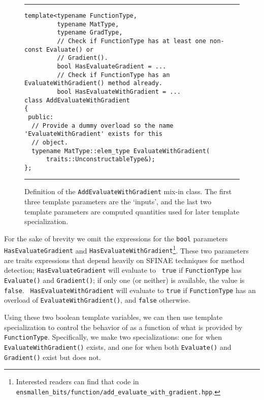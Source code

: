 \begin{figure}[b!]
\hrule
\vspace{1ex}
\begin{verbatim}
template<typename FunctionType,
         typename MatType,
         typename GradType,
         // Check if FunctionType has at least one non-const Evaluate() or
         // Gradient().
         bool HasEvaluateGradient = ...
         // Check if FunctionType has an EvaluateWithGradient() method already.
         bool HasEvaluateWithGradient = ...
class AddEvaluateWithGradient
{
 public:
  // Provide a dummy overload so the name 'EvaluateWithGradient' exists for this
  // object.
  typename MatType::elem_type EvaluateWithGradient(
      traits::UnconstructableType&);
};
\end{verbatim}
\hrule
\vspace*{-0.5em}
\caption{Definition of the {\tt AddEvaluateWithGradient} mix-in class.  The
first three template parameters are the `inputs', and the last two template
parameters are computed quantities used for later template specialization.}
\label{fig:aewg}
\end{figure}

For the sake of brevity we omit the expressions for the {\tt bool} parameters
{\tt HasEvaluateGradient} and {\tt HasEvaluateWithGradient}\footnote{Interested
readers can find that code in {\tt
ensmallen\_bits/function/add\_evaluate\_with\_gradient.hpp}.}.  These two
parameters are traits expressions that depend heavily on SFINAE
techniques for method detection; {\tt HasEvaluateGradient} will evaluate to {\tt
true} if {\tt FunctionType} has {\tt Evaluate()} and {\tt Gradient()}; if only
one (or neither) is available, the value is {\tt false}.  {\tt
HasEvaluateWithGradient} will evaluate to {\tt true} if {\tt FunctionType} has
an overload of {\tt EvaluateWithGradient()}, and {\tt false} otherwise.

Using these two boolean template variables, we can then use template
specialization to control the behavior of  as a function of what is provided by {\tt
FunctionType}.  Specifically, we make two specializations: one for when {\tt
EvaluateWithGradient()} exists, and one for when both {\tt Evaluate()} and {\tt
Gradient()} exist but  does not.

